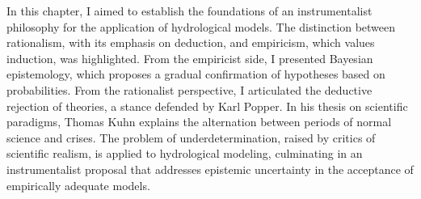 \documentclass[./main_en.tex]{subfiles}
\begin{document}
\par In this chapter, I aimed to establish the foundations of an instrumentalist philosophy for the application of hydrological models. The distinction between rationalism, with its emphasis on deduction, and empiricism, which values induction, was highlighted. From the empiricist side, I presented Bayesian epistemology, which proposes a gradual confirmation of hypotheses based on probabilities. From the rationalist perspective, I articulated the deductive rejection of theories, a stance defended by Karl Popper. In his thesis on scientific paradigms, Thomas Kuhn explains the alternation between periods of normal science and crises. The problem of underdetermination, raised by critics of scientific realism, is applied to hydrological modeling, culminating in an instrumentalist proposal that addresses epistemic uncertainty in the acceptance of empirically adequate models.
\end{document}

